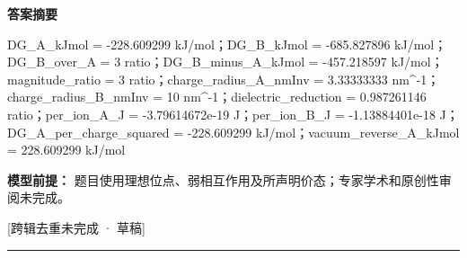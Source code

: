 \documentclass[UTF8,11pt,a4paper]{ctexart}
\begin{document}
\noindent\textbf{答案摘要}\par
DG\_A\_kJmol = -228.609299 kJ/mol；DG\_B\_kJmol = -685.827896 kJ/mol；DG\_B\_over\_A = 3 ratio；DG\_B\_minus\_A\_kJmol = -457.218597 kJ/mol；magnitude\_ratio = 3 ratio；charge\_radius\_A\_nmInv = 3.33333333 nm\textasciicircum{}-1；charge\_radius\_B\_nmInv = 10 nm\textasciicircum{}-1；dielectric\_reduction = 0.987261146 ratio；per\_ion\_A\_J = -3.79614672e-19 J；per\_ion\_B\_J = -1.13884401e-18 J；DG\_A\_per\_charge\_squared = -228.609299 kJ/mol；vacuum\_reverse\_A\_kJmol = 228.609299 kJ/mol\par
\noindent\textbf{模型前提：}
题目使用理想位点、弱相互作用及所声明价态；专家学术和原创性审阅未完成。\par
\noindent\textcolor{red!65!black}{[跨辑去重未完成 · 草稿]} \par
\medskip\hrule\medskip
{}
\end{document}
